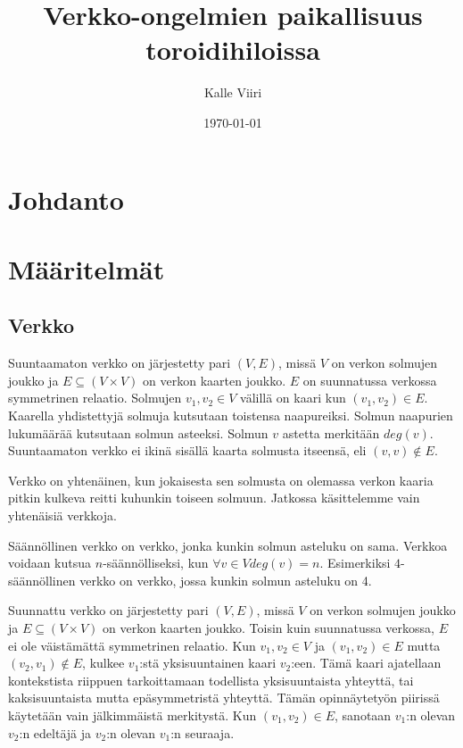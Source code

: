 \documentclass[12pt,finnish]{tktltiki2}
\title{Verkko-ongelmien paikallisuus toroidihiloissa}
\author{Kalle Viiri}
\date{\today}
\theoremstyle{definition}
\theoremstyle{remark}
\begin{document}

\frontmatter      %

\maketitle        %
\makeabstract     %

\tableofcontents  %


\mainmatter       %

\section{Johdanto}

\section{Määritelmät}
\subsection{Verkko}

Suuntaamaton verkko on järjestetty pari $(V, E)$, missä $V$ on verkon solmujen joukko ja $E \subseteq (V \times V)$ on verkon kaarten joukko. $E$ on suunnatussa verkossa symmetrinen relaatio. Solmujen $v_1, v_2 \in V$ välillä on kaari kun $(v_1, v_2) \in E$. Kaarella yhdistettyjä solmuja kutsutaan toistensa naapureiksi. Solmun naapurien lukumäärää kutsutaan solmun asteeksi. Solmun $v$ astetta merkitään $deg(v)$. Suuntaamaton verkko ei ikinä sisällä kaarta solmusta itseensä, eli $(v, v) \notin E$.

Verkko on yhtenäinen, kun jokaisesta sen solmusta on olemassa verkon kaaria pitkin kulkeva reitti kuhunkin toiseen solmuun. Jatkossa käsittelemme vain yhtenäisiä verkkoja.

Säännöllinen verkko on verkko, jonka kunkin solmun asteluku on sama. Verkkoa voidaan kutsua $n$-säännölliseksi, kun $\forall v \in V deg(v) = n$. Esimerkiksi $4$-säännöllinen verkko on verkko, jossa kunkin solmun asteluku on 4.

Suunnattu verkko on järjestetty pari $(V, E)$, missä $V$ on verkon solmujen joukko ja $E \subseteq (V \times V)$ on verkon kaarten joukko. Toisin kuin suunnatussa verkossa, $E$ ei ole väistämättä symmetrinen relaatio. Kun $v_1, v_2 \in V$ ja $(v_1, v_2) \in E$ mutta $(v_2, v_1) \notin E$, kulkee $v_1$:stä yksisuuntainen kaari $v_2$:een. Tämä kaari ajatellaan kontekstista riippuen tarkoittamaan todellista yksisuuntaista yhteyttä, tai kaksisuuntaista mutta epäsymmetristä yhteyttä. Tämän opinnäytetyön piirissä käytetään vain jälkimmäistä merkitystä. Kun $(v_1, v_2) \in E$, sanotaan $v_1$:n olevan $v_2$:n edeltäjä ja $v_2$:n olevan $v_1$:n seuraaja.
\end{document}
